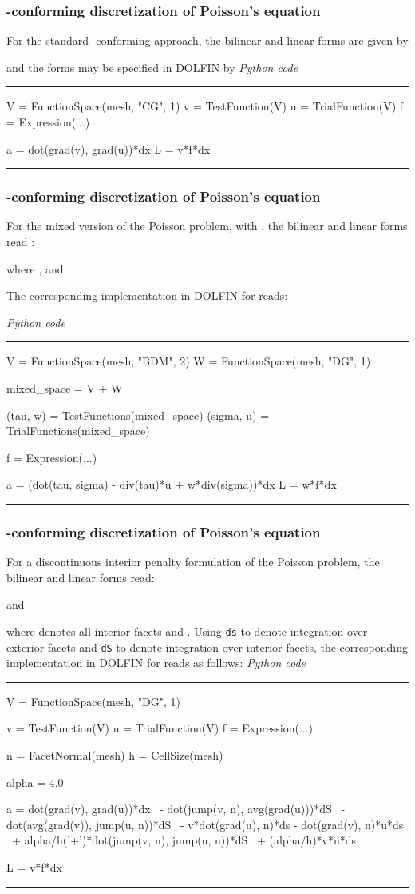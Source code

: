 \documentclass[acmtoms]{acmtrans2m}
\newenvironment{pythoncode}[1]{\center\minipage{#1\textwidth}\footnotesize\hfill\it Python code \rm\vspace{0.1cm}\hrule\renewcommand{\baselinestretch}{0.9}\footnotesize\verbatim}{\endverbatim\hrule\normalsize\endminipage\newline\endcenter}
\newcommand{\dolfin}{DOLFIN}
\begin{document}
\subsubsection{-conforming discretization of Poisson's equation}

For the standard -conforming approach, the bilinear and
linear forms are given by

and the forms may be specified in \dolfin{} by
\begin{pythoncode}{0.9}
V = FunctionSpace(mesh, "CG", 1)
v = TestFunction(V)
u = TrialFunction(V)
f = Expression(...)

a = dot(grad(v), grad(u))*dx
L = v*f*dx
\end{pythoncode}

\subsubsection{-conforming discretization of Poisson's equation}

For the mixed version of the Poisson problem, with , the bilinear and linear forms read
\cite{brezzi:book}:

where ,  and

The corresponding implementation in \dolfin{} for  reads:

\begin{pythoncode}{0.9}
V = FunctionSpace(mesh, "BDM", 2)
W = FunctionSpace(mesh, "DG", 1)

mixed_space = V + W

(tau, w)   = TestFunctions(mixed_space)
(sigma, u) = TrialFunctions(mixed_space)

f = Expression(...)

a = (dot(tau, sigma) - div(tau)*u + w*div(sigma))*dx
L = w*f*dx
\end{pythoncode}

\subsubsection{-conforming discretization of Poisson's equation}

For a discontinuous interior penalty formulation of the Poisson problem,
the bilinear and linear forms read:

and

where  denotes all interior facets and .  Using {\tt ds} to denote integration over exterior
facets and {\tt dS} to denote integration over interior facets,
the corresponding implementation in \dolfin{}
for  reads as follows:
\begin{pythoncode}{0.9}
V = FunctionSpace(mesh, "DG", 1)

v = TestFunction(V)
u = TrialFunction(V)
f = Expression(...)

n = FacetNormal(mesh)
h = CellSize(mesh)

alpha = 4.0

a =   dot(grad(v), grad(u))*dx \
    - dot(jump(v, n), avg(grad(u)))*dS \
    - dot(avg(grad(v)), jump(u, n))*dS \
    - v*dot(grad(u), n)*ds - dot(grad(v), n)*u*ds \
    + alpha/h('+')*dot(jump(v, n), jump(u, n))*dS \
    + (alpha/h)*v*u*ds

L = v*f*dx
\end{pythoncode}
\end{document}
